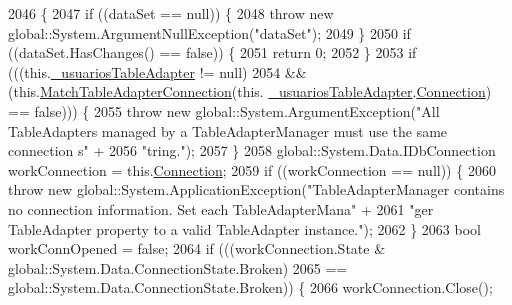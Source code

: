 \begin{DoxyCode}
2046                                                          \{
2047             \textcolor{keywordflow}{if} ((dataSet == null)) \{
2048                 \textcolor{keywordflow}{throw} \textcolor{keyword}{new} global::System.ArgumentNullException(\textcolor{stringliteral}{"dataSet"});
2049             \}
2050             \textcolor{keywordflow}{if} ((dataSet.HasChanges() == \textcolor{keyword}{false})) \{
2051                 \textcolor{keywordflow}{return} 0;
2052             \}
2053             \textcolor{keywordflow}{if} (((this.\hyperlink{class_proyecto___integrador__3_1_1ds_usuarios_table_adapters_1_1_table_adapter_manager_abe0673c88efe0b34254112af02c6501c}{\_usuariosTableAdapter} != null) 
2054                         && (this.\hyperlink{class_proyecto___integrador__3_1_1ds_usuarios_table_adapters_1_1_table_adapter_manager_abecbfe403471a79ea579ec5584df4d6d}{MatchTableAdapterConnection}(this.
      \hyperlink{class_proyecto___integrador__3_1_1ds_usuarios_table_adapters_1_1_table_adapter_manager_abe0673c88efe0b34254112af02c6501c}{\_usuariosTableAdapter}.\hyperlink{class_proyecto___integrador__3_1_1ds_usuarios_table_adapters_1_1_usuarios_table_adapter_a84b2a5b2b50b633d359dc7a29ce2e439}{Connection}) == \textcolor{keyword}{false}))) \{
2055                 \textcolor{keywordflow}{throw} \textcolor{keyword}{new} global::System.ArgumentException(\textcolor{stringliteral}{"All TableAdapters managed by a
       TableAdapterManager must use the same connection s"} +
2056                         \textcolor{stringliteral}{"tring."});
2057             \}
2058             global::System.Data.IDbConnection workConnection = this.\hyperlink{class_proyecto___integrador__3_1_1ds_usuarios_table_adapters_1_1_table_adapter_manager_a46afb4c0851248bad2178681365b7ead}{Connection};
2059             \textcolor{keywordflow}{if} ((workConnection == null)) \{
2060                 \textcolor{keywordflow}{throw} \textcolor{keyword}{new} global::System.ApplicationException(\textcolor{stringliteral}{"TableAdapterManager contains no connection
       information. Set each TableAdapterMana"} +
2061                         \textcolor{stringliteral}{"ger TableAdapter property to a valid TableAdapter instance."});
2062             \}
2063             \textcolor{keywordtype}{bool} workConnOpened = \textcolor{keyword}{false};
2064             \textcolor{keywordflow}{if} (((workConnection.State & global::System.Data.ConnectionState.Broken) 
2065                         == global::System.Data.ConnectionState.Broken)) \{
2066                 workConnection.Close();

\end{DoxyCode}
